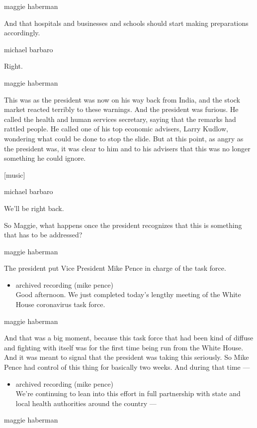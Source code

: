 maggie haberman

And that hospitals and businesses and schools should start making
preparations accordingly.

michael barbaro

Right.

maggie haberman

This was as the president was now on his way back from India, and the
stock market reacted terribly to these warnings. And the president was
furious. He called the health and human services secretary, saying that
the remarks had rattled people. He called one of his top economic
advisers, Larry Kudlow, wondering what could be done to stop the slide.
But at this point, as angry as the president was, it was clear to him
and to his advisers that this was no longer something he could ignore.

{[}music{]}

michael barbaro

We'll be right back.

So Maggie, what happens once the president recognizes that this is
something that has to be addressed?

maggie haberman

The president put Vice President Mike Pence in charge of the task force.

\begin{itemize}
\tightlist
\item
  archived recording (mike pence)\\
  Good afternoon. We just completed today's lengthy meeting of the White
  House coronavirus task force.
\end{itemize}

maggie haberman

And that was a big moment, because this task force that had been kind of
diffuse and fighting with itself was for the first time being run from
the White House. And it was meant to signal that the president was
taking this seriously. So Mike Pence had control of this thing for
basically two weeks. And during that time ---

\begin{itemize}
\tightlist
\item
  archived recording (mike pence)\\
  We're continuing to lean into this effort in full partnership with
  state and local health authorities around the country ---
\end{itemize}

maggie haberman

